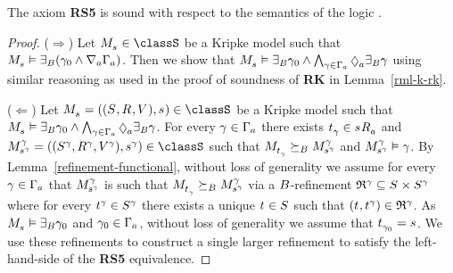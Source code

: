 \begin{lemma}\label{rml-s5-rs5}
The axiom {\bf RS5} is sound with respect to the semantics of the logic \logicRmlS{}.
\end{lemma}

\begin{proof}
($\Rightarrow$) 
Let $\kPModel{\kStateS} \in \classS$ be a Kripke model such that $\kPModel{\kStateS} \entails \somerefsBs (\gamma_0 \land \coversA \Gamma_\agentA)$.
Then we show that $\kPModel{\kStateS} \entails \somerefsBs \gamma_0 \land \bigwedge_{\gamma \in \Gamma_\agentA} \possibleA \somerefsBs \gamma$ using similar reasoning as used in the proof of soundness of {\bf RK} in Lemma~\ref{rml-k-rk}.

($\Leftarrow$)
Let $\kPModelAndTuple{\kStateS} \in \classS$ be a Kripke model such that $\kPModel{\kStateS} \entails \somerefsBs \gamma_0 \land \bigwedge_{\gamma \in \Gamma_\agentA} \possibleA \somerefsBs \gamma$.
For every $\gamma \in \Gamma_\agentA$ there exists $\kStateT_\gamma \in \kSuccessorsA{\kStateS}$ and $\kPModelAndTuple[\gamma]{\kStateS[\gamma]} \in \classS$ such that $\kPModel{\kStateT_\gamma} \simulatesBs \kPModel[\gamma]{\kStateS[\gamma]}$ and $\kPModel[\gamma]{\kStateS[\gamma]} \entails \gamma$.
By Lemma~\ref{refinement-functional}, without loss of generality we assume for every $\gamma \in \Gamma_\agentA$ that $\kPModel[\gamma]{\kStateS[\gamma]}$ is such that $\kPModel{\kStateT_\gamma} \simulatesBs \kPModel[\gamma]{\kStateS[\gamma]}$ via a $\agentsB$-refinement $\refinement^{\gamma} \subseteq \kStates \times \kStates[\gamma]$ where for every $\kStateT[\gamma] \in \kStates[\gamma]$ there exists a unique $\kStateT \in \kStates$ such that $(\kStateT, \kStateT[\gamma]) \in \refinement^{\gamma}$.
As $\kPModel{\kStateS} \entails \somerefsBs \gamma_0$ and $\gamma_0 \in \Gamma_\agentA$, without loss of generality we assume that $\kStateT_{\gamma_0} = \kStateS$.
We use these refinements to construct a single larger refinement to satisfy the left-hand-side of the {\bf RS5} equivalence.


\end{proof}

